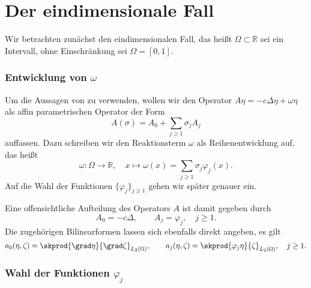 
\section{Der eindimensionale Fall} %
\label{sec:der_eindimensionale_fall}

Wir betrachten zunächst den eindimensionalen Fall, das heißt $\Omega \subset \mathbb{R}$ sei ein Intervall, ohne Einschränkung sei $\Omega = [0, 1]$.

\subsubsection{Entwicklung von $\omega$} %
\label{ssub:entwicklung_von_}

Um die Aussagen von \cite{Kunoth:2013ef} zu verwenden, wollen wir den Operator $A \eta = - c \Delta \eta + \omega \eta$ als affin parametrischen Operator der Form
\begin{equation}
    A(\sigma) = A_{0} + \sum_{j \geq 1} \sigma_{j} A_{j}
\end{equation}
auffassen.
Dazu schreiben wir den Reaktionsterm $\omega$ als Reihenentwicklung auf, das heißt
\begin{equation}
    \label{eq:omega_reihenentwicklung}
    \omega \colon \Omega \to \mathbb{R}, \quad x \mapsto \omega(x) = \sum_{j \geq 1} \sigma_{j} \varphi_{j}(x).
\end{equation}
Auf die Wahl der Funktionen $\{ \varphi_{j} \}_{j \geq 1}$ gehen wir später genauer ein.

Eine offensichtliche Aufteilung des Operators $A$ ist damit gegeben durch
\begin{equation}
    A_{0} = - c \Delta, \qquad
    A_{j} = \varphi_{j}, \quad j \geq 1.
\end{equation}
Die zugehörigen Bilinearformen lassen sich ebenfalls direkt angeben, es gilt
\begin{equation}
    a_{0}(\eta, \zeta) = \skprod{\grad \eta}{\grad \zeta}_{L_{2}(\Omega)}, \qquad a_{j}(\eta, \zeta) = \skprod{\varphi_{j} \eta}{\zeta}_{L_{2}(\Omega)}, \quad j \geq 1.
\end{equation}


\subsubsection{Wahl der Funktionen $\varphi_{j}$} %
\label{ssub:wahl_der_funktionen_}

